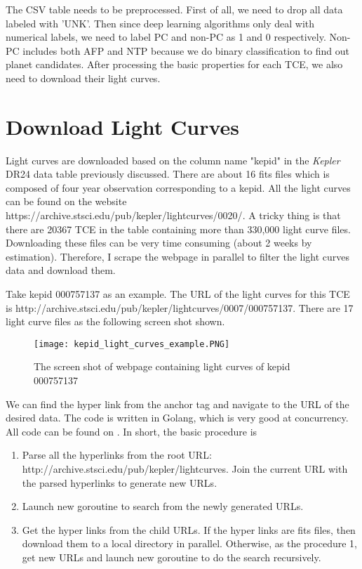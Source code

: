   The CSV table needs to be preprocessed. First of all, we need to drop all data labeled with 
  'UNK'. Then since deep learning algorithms only deal with numerical labels, we need to 
  label PC and non-PC as 1 and 0 respectively. Non-PC includes both AFP and NTP because we do 
  binary classification to find out planet candidates. After processing the basic properties 
  for each TCE, we also need to download their light curves.

  \section{Download Light Curves}
    Light curves are downloaded based on the column name "kepid" in the \textit{Kepler} DR24 
    data table previously discussed. There are about 16 fits files which is composed of four 
    year observation corresponding to a kepid. All the light curves can be found on the 
    website 
    {https://archive.stsci.edu/pub/kepler/lightcurves/0020/}. A tricky thing is that 
    there are 20367 TCE
    in the table containing more than 330,000 light curve files. Downloading these 
    files can be very time consuming (about 2 weeks by estimation). Therefore, I scrape the 
    webpage in parallel to filter the light curves data and download them. 

    Take kepid 000757137 as an example. The URL of the light curves for this TCE is 
    {http://archive.stsci.edu/pub/kepler/lightcurves/0007/000757137}. There are 17 light 
    curve files as the following screen shot shown.
    \begin{figure}[!htp]
      \centering
      \texttt{[image: kepid\_light\_curves\_example.PNG]}
      \caption{The screen shot of webpage containing light curves of kepid 000757137}
      \label{fig: kepid_light_curves_example}
    \end{figure}

    We can find the hyper link from the anchor tag and navigate to the URL of the desired 
    data. The code is written in Golang, which is very good at concurrency. All code can be 
    found on .
    In short, the basic procedure is 
    \begin{enumerate}
      \item Parse all the hyperlinks from the root URL: \\
        {http://archive.stsci.edu/pub/kepler/lightcurves}. Join the current URL with 
        the parsed hyperlinks to generate new URLs. 
      \item Launch new goroutine to search from the newly generated URLs.
      \item Get the hyper links from the child URLs. If the hyper links are fits files, 
        then download them to a local directory in parallel. 
        Otherwise, as the procedure 1, get new 
        URLs and launch new goroutine to do the search recursively.
    \end{enumerate}

